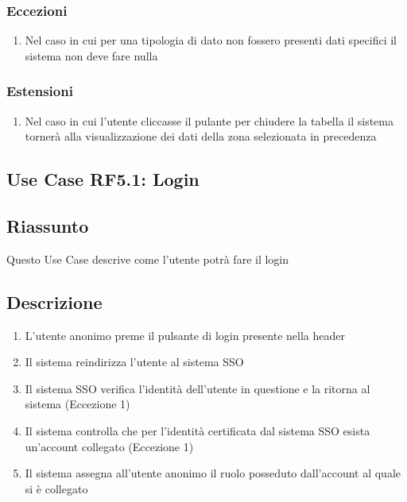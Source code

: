         \subsubsection{Eccezioni}
            \begin{enumerate}
                \item Nel caso in cui per una tipologia di dato non fossero presenti dati specifici il sistema non deve fare nulla
            \end{enumerate}
        \subsubsection{Estensioni}
            \begin{enumerate}
                \item Nel caso in cui l'utente cliccasse il pulante per chiudere la tabella il sistema tornerà alla visualizzazione dei dati della zona selezionata in precedenza
            \end{enumerate}

    \subsection{Use Case RF5.1: Login}
        \subsection{Riassunto}
            Questo Use Case descrive come l'utente potrà fare il login
        \subsection{Descrizione}
            \begin{enumerate}
                \item L'utente anonimo preme il pulsante di login presente nella header
                \item Il sistema reindirizza l'utente al sistema SSO
                \item Il sistema SSO verifica l'identità dell'utente in questione e la ritorna al sistema (Eccezione 1)
                \item Il sistema controlla che per l'identità certificata dal sistema SSO esista un'account collegato (Eccezione 1)
                \item Il sistema assegna all'utente anonimo il ruolo posseduto dall'account al quale si è collegato
            \end{enumerate}
